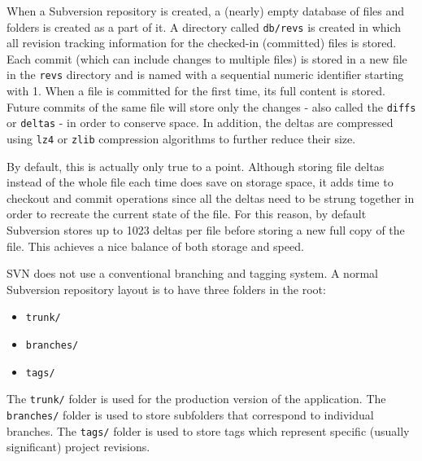 When a Subversion repository is created, a (nearly) empty database of files and folders is created as a part of it. A directory called \lstinline{db/revs} is created in which all revision tracking information for the checked-in (committed) files is stored. Each commit (which can include changes to multiple files) is stored in a new file in the \lstinline{revs} directory and is named with a sequential numeric identifier starting with 1. When a file is committed for the first time, its full content is stored. Future commits of the same file will store only the changes - also called the \lstinline{diffs} or \lstinline{deltas} - in order to conserve space. In addition, the deltas are compressed using \lstinline{lz4} or \lstinline{zlib} compression algorithms to further reduce their size.

By default, this is actually only true to a point. Although storing file deltas instead of the whole file each time does save on storage space, it adds time to checkout and commit operations since all the deltas need to be strung together in order to recreate the current state of the file. For this reason, by default Subversion stores up to 1023 deltas per file before storing a new full copy of the file. This achieves a nice balance of both storage and speed.

SVN does not use a conventional branching and tagging system. A normal Subversion repository layout is to have three folders in the root:
\begin{itemize}
    \item \lstinline{trunk/}
    \item \lstinline{branches/}
    \item \lstinline{tags/}
\end{itemize}
The \lstinline{trunk/} folder is used for the production version of the application.
The \lstinline{branches/} folder is used to store subfolders that correspond to individual branches.
The \lstinline{tags/} folder is used to store tags which represent specific (usually significant) project revisions.

